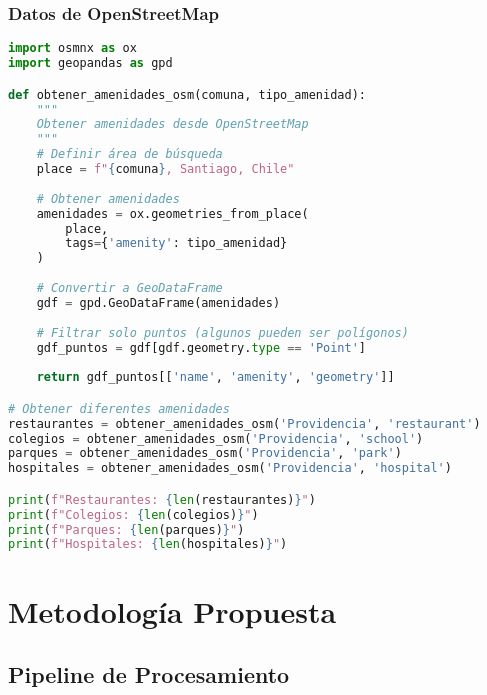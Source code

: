 \documentclass[11pt,a4paper]{article}
\begin{document}
\subsubsection{Datos de OpenStreetMap}

\begin{lstlisting}[language=Python]
import osmnx as ox
import geopandas as gpd

def obtener_amenidades_osm(comuna, tipo_amenidad):
    """
    Obtener amenidades desde OpenStreetMap
    """
    # Definir área de búsqueda
    place = f"{comuna}, Santiago, Chile"
    
    # Obtener amenidades
    amenidades = ox.geometries_from_place(
        place, 
        tags={'amenity': tipo_amenidad}
    )
    
    # Convertir a GeoDataFrame
    gdf = gpd.GeoDataFrame(amenidades)
    
    # Filtrar solo puntos (algunos pueden ser polígonos)
    gdf_puntos = gdf[gdf.geometry.type == 'Point']
    
    return gdf_puntos[['name', 'amenity', 'geometry']]

# Obtener diferentes amenidades
restaurantes = obtener_amenidades_osm('Providencia', 'restaurant')
colegios = obtener_amenidades_osm('Providencia', 'school')
parques = obtener_amenidades_osm('Providencia', 'park')
hospitales = obtener_amenidades_osm('Providencia', 'hospital')

print(f"Restaurantes: {len(restaurantes)}")
print(f"Colegios: {len(colegios)}")
print(f"Parques: {len(parques)}")
print(f"Hospitales: {len(hospitales)}")
\end{lstlisting}

\newpage

\section{Metodología Propuesta}

\subsection{Pipeline de Procesamiento}
\end{document}
